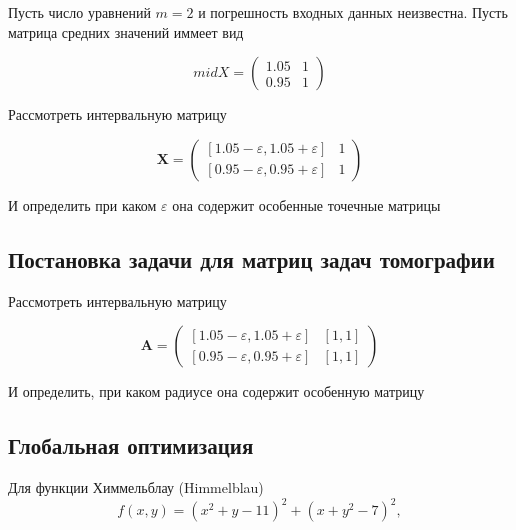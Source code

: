 \documentclass[12pt,a4paper]{article}
\begin{document}
	        Пусть число уравнений $m = 2$ и погрешность входных данных неизвестна. Пусть матрица средних значений иммеет вид
	        
	        \begin{equation}
	            midX = \begin{pmatrix}
            		1.05 & 1 \\
            		0.95 & 1
            		\end{pmatrix}
	        \end{equation}
	        
	        Рассмотреть интервальную матрицу 
	        
	        \begin{equation}\label{lin_reg}
	            \textbf{X} = \begin{pmatrix}
            		[1.05 - \varepsilon, 1.05 + \varepsilon] & 1 \\
            		[0.95 - \varepsilon, 0.95 + \varepsilon] & 1
            	\end{pmatrix}
	        \end{equation}
	        
	        И определить при каком $\varepsilon$ она содержит особенные точечные матрицы
	        
	        
        \subsection{Постановка задачи для матриц задач томографии}\label{problem:tomography}
            Рассмотреть интервальную матрицу 
	        
	        \begin{equation} \label{matrix_A}
            	\textbf{A} = \begin{pmatrix}
            		[1.05 - \varepsilon, 1.05 + \varepsilon] & [1 , 1 ] \\
            		[0.95 - \varepsilon, 0.95 + \varepsilon] & [1 , 1 ]
            	\end{pmatrix}
            \end{equation}
            
            И определить, при каком радиусе она содержит особенную матрицу
            
            
            
        \subsection{Глобальная оптимизация}
            Для функции Химмельблау (Himmelblau)
            \begin{equation}\label{Himmel}
                f(x, y) = (x^2 + y - 11)^2 + (x + y^2 - 7)^2,
            \end{equation}
            
\end{document}
